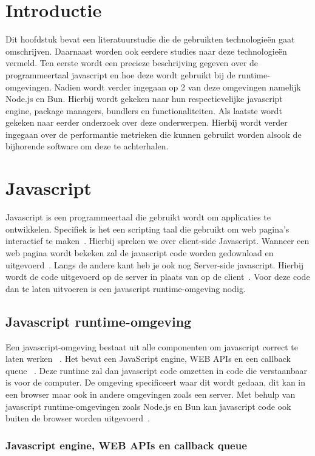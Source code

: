 \section{Introductie}
Dit hoofdstuk bevat een literatuurstudie die de gebruikten technologieën gaat omschrijven. 
Daarnaast worden ook eerdere studies naar deze technologieën vermeld. 
Ten eerste wordt een precieze beschrijving gegeven over de programmeertaal javascript en hoe deze wordt gebruikt bij de runtime-omgevingen.
Nadien wordt verder ingegaan op 2 van deze omgevingen namelijk Node.js en Bun. 
Hierbij wordt gekeken naar hun respectievelijke javascript engine, package managers, bundlers en functionaliteiten.
Als laatste wordt gekeken naar eerder onderzoek over deze onderwerpen. 
Hierbij wordt verder ingegaan over de performantie metrieken die kunnen gebruikt worden alsook de bijhorende 
software om deze te achterhalen.

\section{Javascript}
Javascript is een programmeertaal die gebruikt wordt om applicaties te ontwikkelen. 
Specifiek is het een scripting taal die gebruikt om web pagina's interactief te maken~\autocite{Mozilla2023}.
Hierbij spreken we over client-side Javascript. Wanneer een web pagina wordt bekeken zal de javascript code worden 
gedownload en uitgevoerd~\autocite{JonathanBrownCFA2024}. Langs de andere kant heb je ook nog Server-side javascript. 
Hierbij wordt de code uitgevoerd op de server in plaats van op de client~\autocite{JonathanBrownCFA2024}. 
Voor deze code dan te laten uitvoeren is een javascript runtime-omgeving nodig. 

\subsection{Javascript runtime-omgeving}
Een javascript-omgeving bestaat uit alle componenten om javascript correct te laten werken ~\autocite{Christopher}. 
Het bevat een JavaScript engine, WEB APIs en een callback queue ~\autocite{Christopher}. 
Deze runtime zal dan javascript code omzetten in code die verstaanbaar is voor de computer.
De omgeving specificeert waar dit wordt gedaan, dit kan in een browser maar ook in andere omgevingen zoals een server.
Met behulp van javascript runtime-omgevingen zoals Node.js en Bun kan javascript code ook buiten de browser worden uitgevoerd~\autocite{Mozilla2023}.

\subsubsection{Javascript engine, WEB APIs en callback queue}

